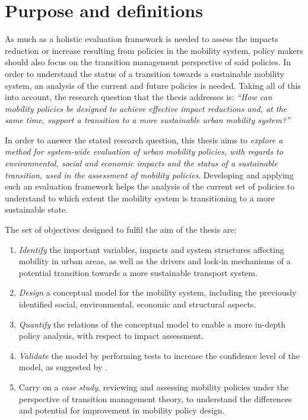 \documentclass[a4paper,fontsize=11pt,bibliography=totoc]{scrartcl}
\begin{document}
\section{Purpose and definitions}
As much as a holistic evaluation framework is needed to assess the impacts reduction or increase resulting from policies in the mobility system, policy makers should also focus on the transition management perspective of said policies. In order to understand the status of a transition towards a sustainable mobility system, an analysis of the current and future policies is needed. Taking all of this into account, the research question that the thesis addresses is: \textit{``How can mobility policies be designed to achieve effective impact reductions and, at the same time, support a transition to a more sustainable urban mobility system?''}

In order to answer the stated research question, this thesis aims to \textit{explore a method for system-wide evaluation of urban mobility policies, with regards to environmental, social and economic impacts and the status of a sustainable transition, used in the assessment of mobility policies}. Developing and applying such an evaluation framework helps the analysis of the current set of policies to understand to which extent the mobility system is transitioning to a more sustainable state.

The set of objectives designed to fulfil the aim of the thesis are:
\begin{enumerate}[label=(\alph*)]
	\item \textit{Identify} the important variables, impacts and system structures affecting mobility in urban areas, as well as the drivers and lock-in mechanisms of a potential transition towards a more sustainable transport system.
	\item \textit{Design} a conceptual model for the mobility system, including the previously identified social, environmental, economic and structural aspects.
	\item \textit{Quantify} the relations of the conceptual model to enable a more in-depth policy analysis, with respect to impact assessment.
	\item \textit{Validate} the model by performing tests to increase the confidence level of the model, as suggested by \textcite{forrester1978_TestsBuildingConfidence,qudrat-ullah2010_Howdostructural}.
	\item Carry on a \textit{case study}, reviewing and assessing mobility policies under the perspective of transition management theory, to understand the differences and potential for improvement in mobility policy design.
\end{enumerate}
\end{document}
